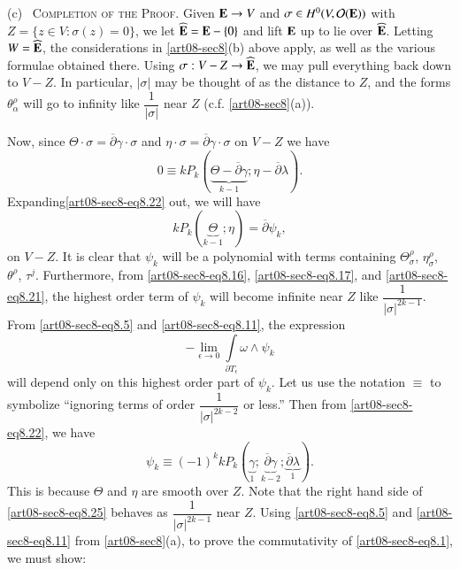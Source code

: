 (c)~ \textsc{Completion of the Proof.} Given $\mathbf{E}\to V$ and $\sigma\in H^{0}(V,\mathcal{O}(\mathbf{E}))$ with $Z=\{z\in V : \sigma(z)=0\}$, we let $\widehat{\mathbf{E}}=\mathbf{E}-\{0\}$ and lift $\mathbf{E}$ up to lie over $\widehat{\mathbf{E}}$. Letting $W=\widehat{\mathbf{E}}$, the considerations in \ref{art08-sec8}(b) above apply, as well as the various formulae obtained there. Using $\sigma:V-Z\to \widehat{\mathbf{E}}$, we may pull everything back down to $V-Z$. In particular, $|\sigma|$ may be thought of as the distance to $Z$, and the forms $\theta^{\rho}_{\alpha}$ will go to infinity like $\dfrac{1}{|\sigma|}$ near $Z$ (c.f. \ref{art08-sec8}(a)).

Now, since $\Theta\cdot \sigma =\overline{\partial}\gamma\cdot \sigma$ and $\eta\cdot \sigma=\overline{\partial}\gamma\cdot \sigma$ on $V-Z$ we have
\begin{equation*}
0\equiv kP_{k}(\underbrace{\Theta-\overline{\partial}\gamma}_{k-1};\eta-\overline{\partial}\lambda).\tag{8.22}\label{art08-sec8-eq8.22}
\end{equation*}
Expanding\pageoriginale \eqref{art08-sec8-eq8.22} out, we will have
\begin{equation*}
kP_{k}(\underbrace{\Theta}_{k-1}; \eta)=\overline{\partial}\psi_{k},\tag{8.23}\label{art08-sec8-eq8.23}
\end{equation*}
on $V-Z$. It is clear that $\psi_{k}$ will be a polynomial with terms containing $\Theta^{\rho}_{\sigma}$, $\eta^{\rho}_{\sigma}$, $\theta^{\rho}$, $\tau^{j}$. Furthermore, from \eqref{art08-sec8-eq8.16}, \eqref{art08-sec8-eq8.17}, and \eqref{art08-sec8-eq8.21}, the highest order term of $\psi_{k}$ will become infinite near $Z$ like $\dfrac{1}{|\sigma|^{2k-1}}$. From \eqref{art08-sec8-eq8.5} and \eqref{art08-sec8-eq8.11}, the expression
\begin{equation*}
-\lim\limits_{\epsilon\to 0}\int\limits_{\partial T_{\epsilon}}\omega\wedge \psi_{k}\tag{8.24}\label{art08-sec8-eq8.24}
\end{equation*}
will depend only on this highest order part of $\psi_{k}$. Let us use the notation $\equiv$ to symbolize ``ignoring terms of order $\dfrac{1}{|\sigma|^{2k-2}}$ or less.'' Then from \eqref{art08-sec8-eq8.22}, we have
\begin{equation*}
\psi_{k}\equiv (-1)^{k}kP_{k}(\underbrace{\gamma}_{1}; \underbrace{\overline{\partial}\gamma}_{k-2}; \underbrace{\overline{\partial}\lambda}_{1}).\tag{8.25}\label{art08-sec8-eq8.25}
\end{equation*}
This is because $\Theta$ and $\eta$ are smooth over $Z$. Note that the right hand side of \eqref{art08-sec8-eq8.25} behaves as $\dfrac{1}{|\sigma|^{2k-1}}$ near $Z$. Using \eqref{art08-sec8-eq8.5} and \eqref{art08-sec8-eq8.11} from \ref{art08-sec8}(a), to prove the commutativity of \eqref{art08-sec8-eq8.1}, we must show:
